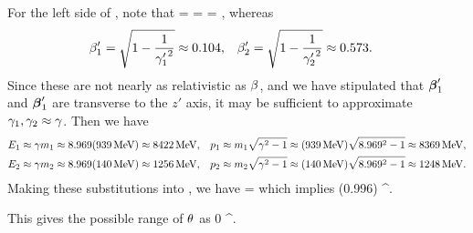 \begin{solution}
	For the left side of , note that
	\beq
		\gam = 
		= \frac{\ELam}{\mLam}
		\approx \gamLam
		\qimplies
		\bet = 
		,
	\eeq
	whereas
	\begin{align*}
		\beta_1' &= \sqrt{1 - \frac{1}{{\gamma_1'}^2}}
		\approx 0.104, &
		\beta_2' &= \sqrt{1 - \frac{1}{{\gamma_2'}^2}}
		\approx 0.573. &
	\end{align*}
	Since these are not nearly as relativistic as $\beta$, and we have stipulated that $\boldsymbol{\beta}'_1$ and $\boldsymbol{\beta}'_1$ are transverse to the $z'$ axis, it may be sufficient to approximate $\gamma_1, \gamma_2 \approx \gamma$.  Then we have
	\begin{align*}
		\Eq &\approx \gam \mq
		\approx \gamLam (\mnuc)
		\approx \Enuc, &
		\pq &\approx \mq \sqrt{\gam^2 - 1}
		\approx (\mnuc) \sqrt{\gamLam^2 - 1}
		\approx \pnuc, \\
		\Ew &\approx \gam \mw
		\approx \gamLam (\mpi)
		\approx \Epi, &
		\pw &\approx \mw \sqrt{\gam^2 - 1}
		\approx (\mpi) \sqrt{\gamLam^2 - 1}
		\approx \ppi.
	\end{align*}
	Making these substitutions into , we have
	\beq
		\cos\tht = 
	\eeq
	which implies
	\beq
		\max\tht \approx \cos[-1](0.996)
		^\circ.
	\eeq
	
	This gives the possible range of $\theta$ as
	\beq
		{\color{blue} 0 \leq \tht {}^\circ}.
	\eeq
	\vfix
\end{solution}
